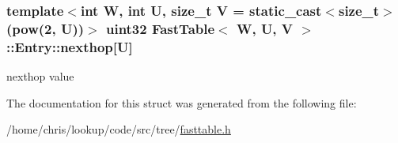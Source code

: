 \hypertarget{structFastTable_1_1Entry_a16ad0923c4753eaf976905068385f12f}{
\subsubsection[{nexthop}]{\setlength{\rightskip}{0pt plus 5cm}template$<$int W, int U, size\-\_\-t V = static\-\_\-cast$<$size\-\_\-t$>$(pow(2, U))$>$ {\bf uint32} {\bf Fast\-Table}$<$ {\bf W}, U, V $>$\-::Entry\-::nexthop\mbox{[}U\mbox{]}}}\label{structFastTable_1_1Entry_a16ad0923c4753eaf976905068385f12f}


nexthop value 



The documentation for this struct was generated from the following file\-:\begin{DoxyCompactItemize}
\item 
/home/chris/lookup/code/src/tree/\hyperlink{fasttable_8h}{fasttable.\-h}\end{DoxyCompactItemize}
